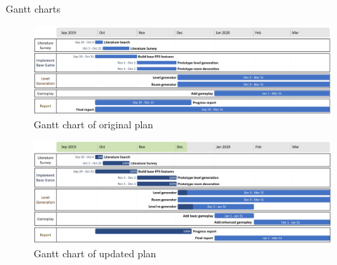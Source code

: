 \documentclass[progress]{cmpreport}
\begin{document}


\newpage

\appendix

\begin{section}{Gantt charts}

\begin{figure}[H]
    \centering
    \includegraphics[angle=90,width=\textwidth,height=0.85\textheight,keepaspectratio]{img/gantt-original2.png}
    \caption{Gantt chart of original plan}
    \label{fig:gantt1}
\end{figure}

\begin{figure}[H]
    \centering
    \includegraphics[angle=90,width=\textwidth,height=0.85\textheight,keepaspectratio]{img/gantt-updated2.png}
    \caption{Gantt chart of updated plan}
    \label{fig:gantt2}
\end{figure}

\end{section}
\end{document}
